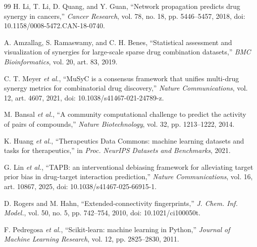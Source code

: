 \documentclass[conference]{IEEEtran}
\begin{document}
\begin{thebibliography}{99}
H. Li, T. Li, D. Quang, and Y. Guan, ``Network propagation predicts drug synergy in cancers,'' \emph{Cancer Research}, vol. 78, no. 18, pp. 5446--5457, 2018, doi: 10.1158/0008-5472.CAN-18-0740.

A. Amzallag, S. Ramaswamy, and C. H. Benes, ``Statistical assessment and visualization of synergies for large-scale sparse drug combination datasets,'' \emph{BMC Bioinformatics}, vol. 20, art. 83, 2019.

C. T. Meyer \emph{et al.}, ``MuSyC is a consensus framework that unifies multi-drug synergy metrics for combinatorial drug discovery,'' \emph{Nature Communications}, vol. 12, art. 4607, 2021, doi: 10.1038/s41467-021-24789-z.

M. Bansal \emph{et al.}, ``A community computational challenge to predict the activity of pairs of compounds,'' \emph{Nature Biotechnology}, vol. 32, pp. 1213--1222, 2014.

K. Huang \emph{et al.}, ``Therapeutics Data Commons: machine learning datasets and tasks for therapeutics,'' in \emph{Proc. NeurIPS Datasets and Benchmarks}, 2021.

G. Lin \emph{et al.}, ``TAPB: an interventional debiasing framework for alleviating target prior bias in drug-target interaction prediction,'' \emph{Nature Communications}, vol. 16, art. 10867, 2025, doi: 10.1038/s41467-025-66915-1.

D. Rogers and M. Hahn, ``Extended-connectivity fingerprints,'' \emph{J. Chem. Inf. Model.}, vol. 50, no. 5, pp. 742--754, 2010, doi: 10.1021/ci100050t.

F. Pedregosa \emph{et al.}, ``Scikit-learn: machine learning in Python,'' \emph{Journal of Machine Learning Research}, vol. 12, pp. 2825--2830, 2011.

\end{thebibliography}
\end{document}
